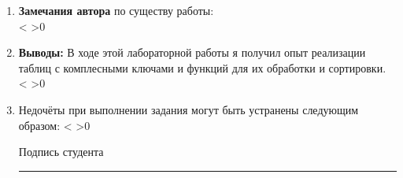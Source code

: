 \documentclass[a4paper]{article}
\makeatletter
\newcounter{i}
\newcommand{\PrintEmptyLines}[1]{\setcounter{i}{1}\@whilenum\value{i}<#1\do{\stepcounter{i}\EmptyLine\\} \ifnum #1>0 {\EmptyLine}\fi}
\newcommand\arulefill[1]{{\expandafter \ulined #1 \hfill}}
\newcommand{\EmptyLine}{\null\arulefill{}}
\newcommand{\mrule}[1]{\rule[-2.8pt]{#1}{.4pt}}
\newcounter{EmptyLines1}
\newcounter{EmptyLines2}
\newcounter{EmptyLines3}
\newcounter{EmptyLines10}
\newcounter{EmptyLines11}
\newcounter{EmptyLines12}
\newcommand{\Textx}{}  %
\newcommand{\Textxi}{
}  %
\makeatother
\begin{document}
\begin{enumerate}[label=\textbf{\arabic*}.]
\item \textbf{Замечания автора} {\footnotesize по существу работы:} \arulefill{\Textx} \\
\PrintEmptyLines{\value{EmptyLines2}}\\

\item \textbf{Выводы:} \arulefill{\footnotesize В ходе этой лабораторной работы я получил опыт реализации таблиц с комплесными ключами и функций для их обработки и сортировки.} \Textxi \\
\PrintEmptyLines{\value{EmptyLines2}}\\


\item Недочёты при выполнении задания могут быть устранены следующим образом: {\footnotesize} \arulefill{\Textx}
\PrintEmptyLines{\value{EmptyLines2}}\\

 \begin{flushright}
Подпись студента \mrule{4cm}
\end{flushright}

\end{enumerate}
\end{document}
